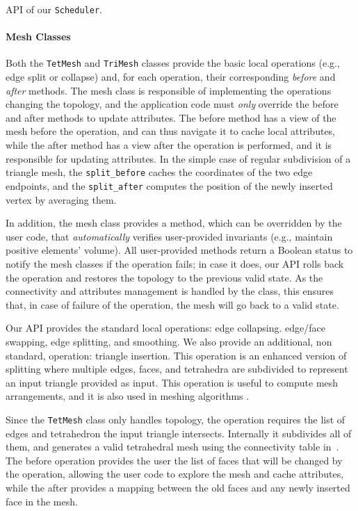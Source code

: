 \begin{longlisting}
\inputminted{cpp}{wmtk-tex/code/scheduler.cpp}
\caption{API of our \texttt{Scheduler}.}
\label{algo:scheduler}
\end{longlisting}

\paragraph{Mesh Classes}
Both the \texttt{TetMesh} and \texttt{TriMesh} classes provide the basic local operations (e.g., edge split or collapse) and, for each operation, their corresponding \emph{before} and \emph{after} methods. The mesh class is responsible of implementing the operations changing the topology, and the application code must \emph{only} override the before and after methods to update attributes. The before method has a view of the mesh before the operation, and can thus navigate it to cache local attributes, while the after method has a view after the operation is performed, and it is responsible for updating attributes. In the simple case of regular subdivision of a triangle mesh, the \texttt{split\_before} caches the coordinates of the two edge endpoints, and the \texttt{split\_after} computes the position of the newly inserted vertex by averaging them. 

In addition, the mesh class provides a method, which can be overridden by the user code, that \emph{automatically} verifies user-provided invariants (e.g., maintain positive elements' volume). All user-provided methods return a Boolean status to notify the mesh classes if the operation fails; in case it does, our API rolls back the operation and restores the topology to the previous valid state. As the connectivity and attributes management is handled by the class, this ensures that, in case of failure of the operation, the mesh will go back to a valid state.

Our API provides the standard local operations: edge collapsing. edge/face swapping, edge splitting, and smoothing. We also provide an additional, non standard, operation: triangle insertion. This operation is an enhanced version of splitting where multiple edges, faces, and tetrahedra are subdivided to represent an input  triangle provided as input. This operation is useful to compute mesh arrangements, and it is also used in meshing algorithms \cite{Hu:2019:fTetWild}.

Since the \texttt{TetMesh} class only handles topology, the operation requires the list of edges and tetrahedron the input triangle intersects. Internally it subdivides all of them, and generates a valid tetrahedral mesh using the connectivity table in~\cite{Hu:2019:fTetWild}. The before operation provides the user the list of  faces that will be changed by the operation, allowing the user code to explore the mesh and cache attributes,  while the after provides a mapping between the old faces and any newly inserted face in the mesh.


